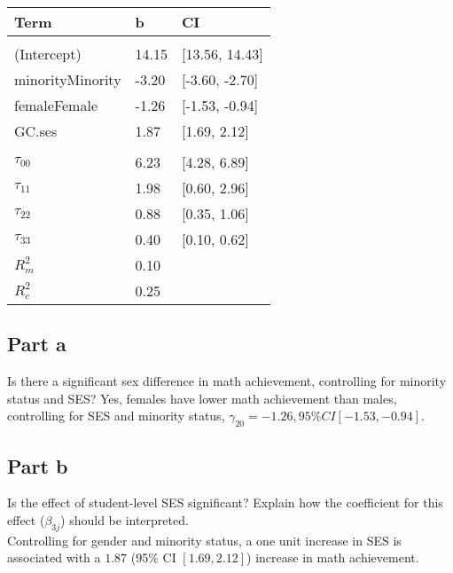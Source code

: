 \documentclass[]{article}
\begin{document}
\begin{table}[H]
\centering
\begin{tabular}{lll}
\toprule
Term & b & CI\\
\midrule
\addlinespace[0.3em]
\multicolumn{3}{l}{\textbf{Fixed}}\\
\hspace{1em}(Intercept) & 14.15 & [13.56, 14.43]\\
\hspace{1em}minorityMinority & -3.20 & [-3.60, -2.70]\\
\hspace{1em}femaleFemale & -1.26 & [-1.53, -0.94]\\
\hspace{1em}GC.ses & 1.87 & [1.69, 2.12]\\
\addlinespace[0.3em]
\multicolumn{3}{l}{\textbf{Random}}\\
\hspace{1em}$\tau_{00}$ & 6.23 & [4.28, 6.89]\\
\hspace{1em}$\tau_{11}$ & 1.98 & [0.60, 2.96]\\
\hspace{1em}$\tau_{22}$ & 0.88 & [0.35, 1.06]\\
\hspace{1em}$\tau_{33}$ & 0.40 & [0.10, 0.62]\\
$R^2_m$ & 0.10 & \\
$R^2_c$ & 0.25 & \\
\bottomrule
\end{tabular}
\end{table}

\subsection{Part a}\label{part-a-1}

Is there a significant sex difference in math achievement, controlling
for minority status and SES? Yes, females have lower math achievement
than males, controlling for SES and minority status,
\(\gamma_{20} = -1.26, 95\% CI [-1.53, -0.94]\).

\subsection{Part b}\label{part-b-1}

Is the effect of student-level SES significant? Explain how the
coefficient for this effect (\(\beta_{3j}\)) should be interpreted.\\
Controlling for gender and minority status, a one unit increase in SES
is associated with a \(1.87\) (95\% CI \([1.69, 2.12]\)) increase in
math achievement.
\end{document}
